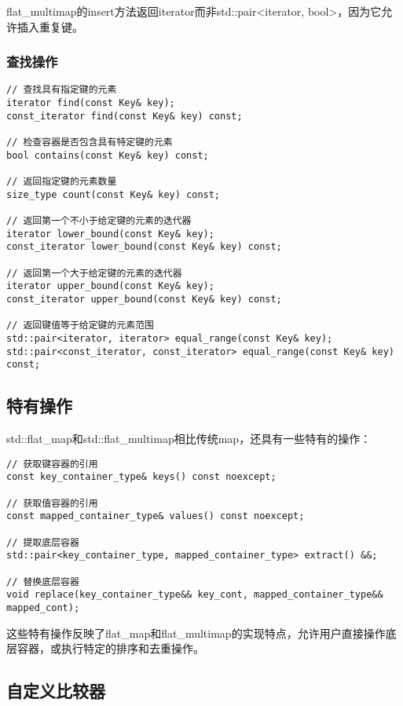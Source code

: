 \documentclass[a4paper, 12pt]{article}
\begin{document}
flat\_multimap的insert方法返回iterator而非std::pair<iterator, bool>，因为它允许插入重复键。

\subsubsection{查找操作}

\begin{lstlisting}[style=cpp]
// 查找具有指定键的元素
iterator find(const Key& key);
const_iterator find(const Key& key) const;

// 检查容器是否包含具有特定键的元素
bool contains(const Key& key) const;

// 返回指定键的元素数量
size_type count(const Key& key) const;

// 返回第一个不小于给定键的元素的迭代器
iterator lower_bound(const Key& key);
const_iterator lower_bound(const Key& key) const;

// 返回第一个大于给定键的元素的迭代器
iterator upper_bound(const Key& key);
const_iterator upper_bound(const Key& key) const;

// 返回键值等于给定键的元素范围
std::pair<iterator, iterator> equal_range(const Key& key);
std::pair<const_iterator, const_iterator> equal_range(const Key& key) const;
\end{lstlisting}

\subsection{特有操作}

std::flat\_map和std::flat\_multimap相比传统map，还具有一些特有的操作：

\begin{lstlisting}[style=cpp]
// 获取键容器的引用
const key_container_type& keys() const noexcept;

// 获取值容器的引用
const mapped_container_type& values() const noexcept;

// 提取底层容器
std::pair<key_container_type, mapped_container_type> extract() &&;

// 替换底层容器
void replace(key_container_type&& key_cont, mapped_container_type&& mapped_cont);
\end{lstlisting}

这些特有操作反映了flat\_map和flat\_multimap的实现特点，允许用户直接操作底层容器，或执行特定的排序和去重操作。

\subsection{自定义比较器}
\end{document}
